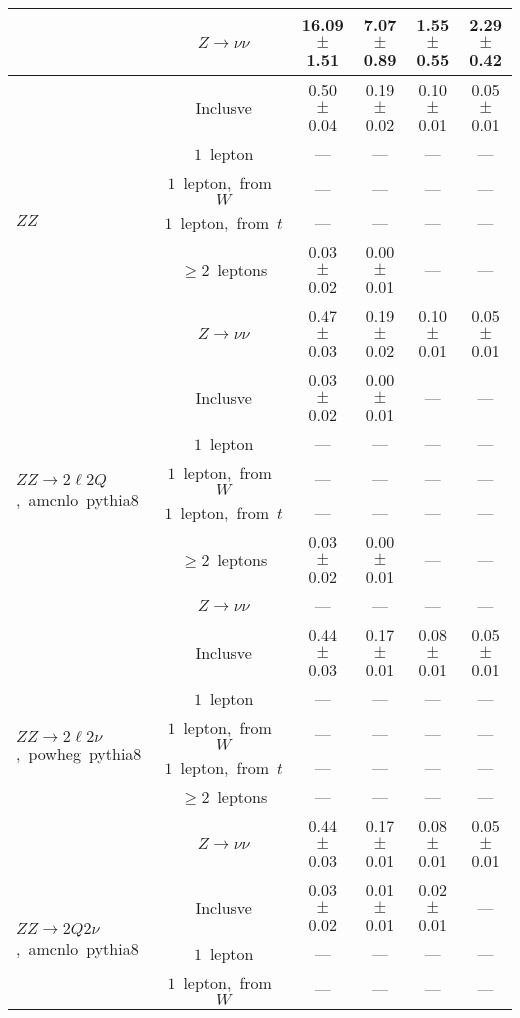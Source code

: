 \documentclass{article}
\begin{document}
\begin{longtable}{|l|c|c|c|c|c|}
 & $Z\rightarrow\nu\nu$  & 16.09 $\pm$ 1.51  & 7.07 $\pm$ 0.89  & 1.55 $\pm$ 0.55  & 2.29 $\pm$ 0.42 \\* 
\hline 
\multirow{6}{*}{$ZZ$} & Inclusve  & 0.50 $\pm$ 0.04  & 0.19 $\pm$ 0.02  & 0.10 $\pm$ 0.01  & 0.05 $\pm$ 0.01 \\* 
 & $1$~lepton  & ---  & ---  & ---  & --- \\* 
 & $1$~lepton,~from~$W$  & ---  & ---  & ---  & --- \\* 
 & $1$~lepton,~from~$t$  & ---  & ---  & ---  & --- \\* 
 & $\ge2$~leptons  & 0.03 $\pm$ 0.02  & 0.00 $\pm$ 0.01  & ---  & --- \\* 
 & $Z\rightarrow\nu\nu$  & 0.47 $\pm$ 0.03  & 0.19 $\pm$ 0.02  & 0.10 $\pm$ 0.01  & 0.05 $\pm$ 0.01 \\* 
\hline 
\multirow{6}{*}{$ZZ{\rightarrow}2{\ell}2Q$,~amcnlo~pythia8} & Inclusve  & 0.03 $\pm$ 0.02  & 0.00 $\pm$ 0.01  & ---  & --- \\* 
 & $1$~lepton  & ---  & ---  & ---  & --- \\* 
 & $1$~lepton,~from~$W$  & ---  & ---  & ---  & --- \\* 
 & $1$~lepton,~from~$t$  & ---  & ---  & ---  & --- \\* 
 & $\ge2$~leptons  & 0.03 $\pm$ 0.02  & 0.00 $\pm$ 0.01  & ---  & --- \\* 
 & $Z\rightarrow\nu\nu$  & ---  & ---  & ---  & --- \\* 
\hline 
\multirow{6}{*}{$ZZ{\rightarrow}2{\ell}2{\nu}$,~powheg~pythia8} & Inclusve  & 0.44 $\pm$ 0.03  & 0.17 $\pm$ 0.01  & 0.08 $\pm$ 0.01  & 0.05 $\pm$ 0.01 \\* 
 & $1$~lepton  & ---  & ---  & ---  & --- \\* 
 & $1$~lepton,~from~$W$  & ---  & ---  & ---  & --- \\* 
 & $1$~lepton,~from~$t$  & ---  & ---  & ---  & --- \\* 
 & $\ge2$~leptons  & ---  & ---  & ---  & --- \\* 
 & $Z\rightarrow\nu\nu$  & 0.44 $\pm$ 0.03  & 0.17 $\pm$ 0.01  & 0.08 $\pm$ 0.01  & 0.05 $\pm$ 0.01 \\* 
\hline 
\multirow{6}{*}{$ZZ{\rightarrow}2Q2{\nu}$,~amcnlo~pythia8} & Inclusve  & 0.03 $\pm$ 0.02  & 0.01 $\pm$ 0.01  & 0.02 $\pm$ 0.01  & --- \\* 
 & $1$~lepton  & ---  & ---  & ---  & --- \\* 
 & $1$~lepton,~from~$W$  & ---  & ---  & ---  & --- \\* 

\end{longtable}
\end{document}
